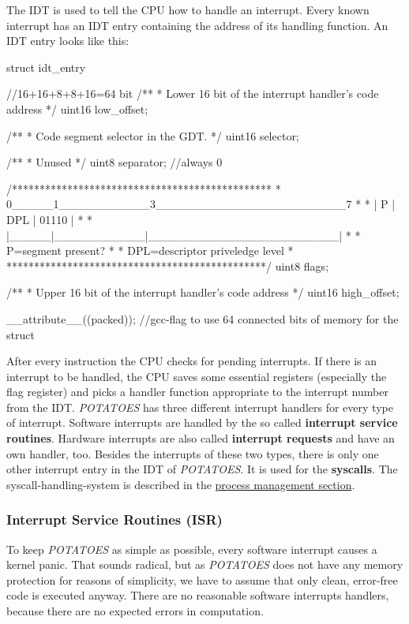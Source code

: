\documentclass[11pt,a4paper]{scrartcl}
\begin{document}
The IDT is used to tell the CPU how to handle an interrupt. Every known interrupt has an IDT entry containing the address of its handling function. An IDT entry looks like this:
\begin{code}
struct idt_entry{ //16+16+8+8+16=64 bit
	/**
	 * Lower 16 bit of the interrupt handler's code address
	 */
	uint16 low_offset;
	
	/**
	 * Code segment selector in the GDT.
	 */
	uint16 selector;
	
	/**
	 * Unused
	 */
	uint8 separator; //always 0
	
	/***********************************************
	 * 0_____1___________3_______________________7 *
	 * |  P  |    DPL    |	 01110	 | *
	 * |_____|___________|_______________________| *
	 * P=segment present?			  *
	 * DPL=descriptor priveledge level	     *
	 ***********************************************/
	uint8 flags;
	
	/**
	 * Upper 16 bit of the interrupt handler's code address
	 */
	uint16 high_offset;
}__attribute__((packed)); //gcc-flag to use 64 connected bits of memory for the struct
\end{code}
After every instruction the CPU checks for pending interrupts. If there is an interrupt to be handled, the CPU saves some essential registers (especially the flag register) and picks a handler function appropriate to the interrupt number from the IDT. \textit{POTATOES} has three different interrupt handlers for every type of interrupt. Software interrupts are handled by the so called \textbf{interrupt service routines}. Hardware interrupts are also called \textbf{interrupt requests} and have an own handler, too. Besides the interrupts of these two types, there is only one other interrupt entry in the IDT of \textit{POTATOES}. It is used for the \textbf{syscalls}. The syscall-handling-system is described in the \hyperlink{SYSCALL}{process management section}.
\subsubsection{Interrupt Service Routines (ISR)}
To keep \textit{POTATOES} as simple as possible, every software interrupt causes a kernel panic. That sounds radical, but as \textit{POTATOES} does not have any memory protection for reasons of simplicity, we have to assume that only clean, error-free code is executed anyway. There are no reasonable software interrupts handlers, because there are no expected errors in computation.
\end{document}
